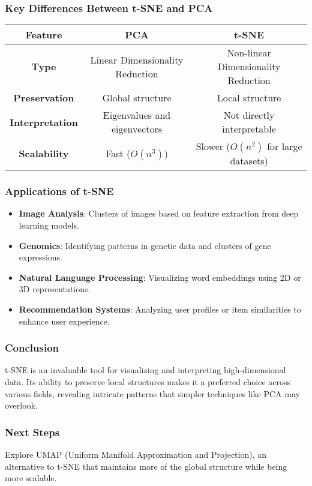 \documentclass[aspectratio=169]{beamer}
\begin{document}
\begin{frame}[fragile]
    \frametitle{Key Differences Between t-SNE and PCA}
    \begin{center}
    \begin{tabular}{|c|c|c|}
    \hline
    \textbf{Feature} & \textbf{PCA} & \textbf{t-SNE} \\
    \hline
    \textbf{Type} & Linear Dimensionality Reduction & Non-linear Dimensionality Reduction \\
    \hline
    \textbf{Preservation} & Global structure & Local structure \\
    \hline
    \textbf{Interpretation} & Eigenvalues and eigenvectors & Not directly interpretable \\
    \hline
    \textbf{Scalability} & Fast (\(O(n^3)\)) & Slower (\(O(n^2)\) for large datasets) \\
    \hline
    \end{tabular}
    \end{center}
\end{frame}

\begin{frame}[fragile]
    \frametitle{Applications of t-SNE}
    \begin{itemize}
        \item \textbf{Image Analysis}: Clusters of images based on feature extraction from deep learning models.
        \item \textbf{Genomics}: Identifying patterns in genetic data and clusters of gene expressions.
        \item \textbf{Natural Language Processing}: Visualizing word embeddings using 2D or 3D representations.
        \item \textbf{Recommendation Systems}: Analyzing user profiles or item similarities to enhance user experience.
    \end{itemize}
\end{frame}

\begin{frame}[fragile]
    \frametitle{Conclusion}
    t-SNE is an invaluable tool for visualizing and interpreting high-dimensional data. Its ability to preserve local structures makes it a preferred choice across various fields, revealing intricate patterns that simpler techniques like PCA may overlook.
\end{frame}

\begin{frame}[fragile]
    \frametitle{Next Steps}
    Explore UMAP (Uniform Manifold Approximation and Projection), an alternative to t-SNE that maintains more of the global structure while being more scalable.
\end{frame}
\end{document}
